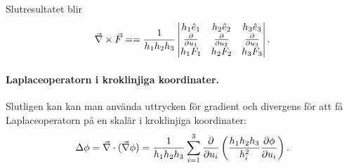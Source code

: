\documentclass[%
oneside,                 %
final,                   %
10pt]{article}
\begin{document}
\noindent
Slutresultatet blir
\begin{equation}
\vec{\nabla} \times \vec{F} = = \frac{1}{h_1 h_2 h_3} \left|
\begin{matrix}
h_1 \hat{e}_1 & h_2\hat{e}_2 & h_3\hat{e}_3\cr
\frac{\partial }{\partial u_1} & \frac{\partial }{\partial u_2} & \frac{\partial }{\partial u_3}\cr
h_1F_1 & h_2F_2 & h_3F_3 \cr
\end{matrix} \right| .
\end{equation}

\paragraph{Laplaceoperatorn i kroklinjiga koordinater.}
Slutligen kan kan man använda uttrycken för gradient och divergens för att få  Laplaceoperatorn på en skalär i kroklinjiga koordinater:
\begin{equation}
\Delta\phi=\vec{\nabla} \cdot (\vec{\nabla}\phi)
=\frac{1}{h_1h_2h_3}\sum_{i=1}^3
\frac{\partial}{\partial u_i} \left( \frac{h_1h_2h_3}{h_i^2} \frac{\partial\phi}{\partial u_i} \right).
\end{equation}
\end{document}
